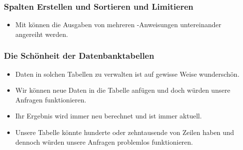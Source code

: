 \documentclass[aspectratio=169,mathserif,notheorems]{beamer}%
\begin{document}
%
%
%
\begin{frame}[t]
\frametitle{Spalten Erstellen und Sortieren und Limitieren}%
\begin{itemize}%
\item Mit  können die Ausgaben von mehreren -Anweisungen untereinander angereiht werden\cite{PGDG:PD:CQUIE}.%
\end{itemize}%
%
\end{frame}
%
%
\begin{frame}%
\frametitle{Die Schönheit der Datenbanktabellen}%
\begin{itemize}%
\item Daten in solchen Tabellen zu verwalten ist auf gewisse Weise wunderschön.%
\item<2-> Wir können neue Daten in die Tabelle anfügen und doch würden unsere Anfragen funktionieren.%
\item<3-> Ihr Ergebnis wird immer neu berechnet und ist immer aktuell.%
\item<4-> Unsere Tabelle könnte hunderte oder zehntausende von Zeilen haben und dennoch würden unsere Anfragen problemlos funktionieren.%
\end{itemize}%
\end{frame}%
%
%
\end{document}
